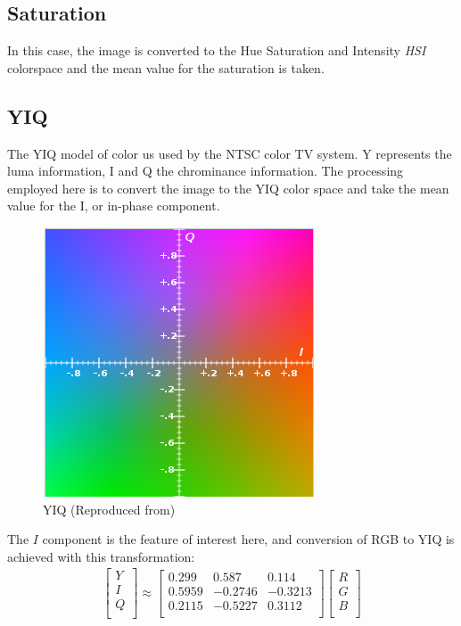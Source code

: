 \documentclass[letterpaper]{article}
\begin{document}
{%
\subsection{Saturation}
In this case, the image is converted to the Hue Saturation and Intensity {\it HSI} colorspace and the mean value for the saturation is taken. \cite{Various_undated-yv}

\subsection{YIQ}
The YIQ model of color us used by the NTSC color TV system. Y represents the luma information, I and Q the chrominance information. The processing employed here is to convert the image to the YIQ color space and take the mean value for the I, or in-phase component.
\begin{figure}[h!]
	\centering
	\includegraphics[width=0.4\linewidth]{./figures/yiq.png}
	\caption{YIQ (Reproduced from\protect\cite{Various_undated-cz})}
	\label{fig:yiq}
\end{figure}
The $I$ component is the feature of interest here, and conversion of RGB to YIQ is achieved with this transformation:
\begin{eqnarray*}
	\begin{bmatrix}
	Y \\[0.3em]
	I \\[0.3em]
	Q \\[0.3em]
	\end{bmatrix}
	\approx
	\begin{bmatrix}
	0.299 & 0.587 & 0.114 \\[0.3em]
	0.5959 & -0.2746 & -0.3213\\[0.3em]
	0.2115 & -0.5227 & 0.3112 \\[0.3em]
	\end{bmatrix}
	\begin{bmatrix}
	R \\[0.3em]
	G \\[0.3em]
	B \\[0.3em]
	\end{bmatrix}	
\end{eqnarray*}

}
\end{document}
